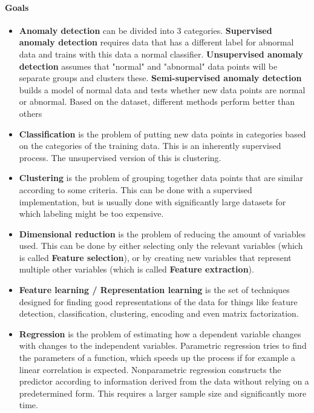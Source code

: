 \paragraph{Goals}
\begin{itemize}
	\item \textbf{Anomaly detection}
		can be divided into 3 categories. \textbf{Supervised anomaly detection} requires data that has a different label for abnormal data and trains with this data a normal classifier. \textbf{Unsupervised anomaly detection} assumes that "normal" and "abnormal" data points will be separate groups and clusters these. \textbf{Semi-supervised anomaly detection} builds a model of normal data and tests whether new data points are normal or abnormal. Based on the dataset, different methods perform better than others
	\item \textbf{Classification}
		is the problem of putting new data points in categories based on the categories of the training data. This is an inherently supervised process. The unsupervised version of this is clustering.
	\item \textbf{Clustering}
		is the problem of grouping together data points that are similar according to some criteria. This can be done with a supervised implementation, but is usually done with significantly large datasets for which labeling might be too expensive.
	\item \textbf{Dimensional reduction}
		is the problem of reducing the amount of variables used. This can be done by either selecting only the relevant variables (which is called \textbf{Feature selection}), or by creating new variables that represent multiple other variables (which is called \textbf{Feature extraction}).
	\item \textbf{Feature learning / Representation learning}
		is the set of techniques designed for finding good representations of the data for things like feature detection, classification, clustering, encoding and even matrix factorization.
	\item \textbf{Regression}
		is the problem of estimating how a dependent variable changes with changes to the independent variables. Parametric regression tries to find the parameters of a function, which speeds up the process if for example a linear correlation is expected. Nonparametric regression constructs the predictor according to information derived from the data without relying on a predetermined form. This requires a larger sample size and significantly more time.
\end{itemize}


